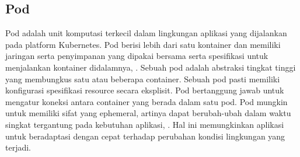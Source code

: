 \subsection{Pod}
Pod adalah unit komputasi terkecil dalam lingkungan aplikasi yang dijalankan pada platform Kubernetes. Pod berisi lebih dari satu kontainer dan memiliki jaringan serta penyimpanan yang dipakai bersama serta spesifikasi untuk menjalankan kontainer didalamnya, \parencite{pod}.
Sebuah pod adalah abstraksi tingkat tinggi yang membungkus satu atau beberapa container. Sebuah pod pasti memiliki konfigurasi spesifikasi resource secara eksplisit. Pod bertanggung jawab untuk mengatur koneksi antara container yang berada dalam satu pod. Pod mungkin untuk memiliki sifat yang ephemeral, artinya dapat berubah-ubah dalam waktu singkat tergantung pada kebutuhan aplikasi, \parencite{ephemeral}. Hal ini memungkinkan aplikasi untuk beradaptasi dengan cepat terhadap perubahan kondisi lingkungan yang terjadi.